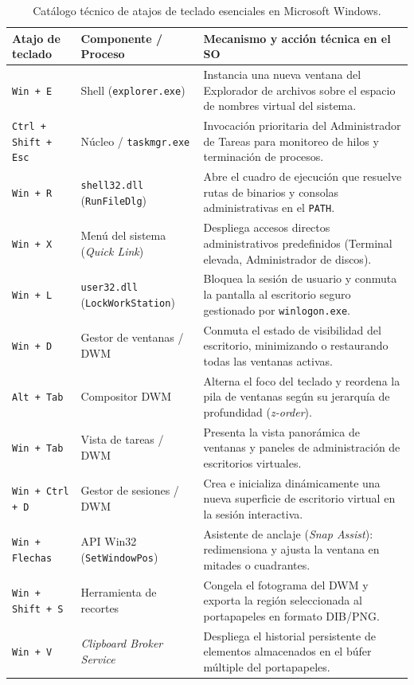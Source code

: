 \documentclass[12pt]{article}
\begin{document}
\begin{table}[htbp]
\centering
\footnotesize
\renewcommand{\arraystretch}{1.08}
\renewcommand{\tabularxcolumn}[1]{m{#1}}
\setlength{\emergencystretch}{1.5em}
\caption{Catálogo técnico de atajos de teclado esenciales en Microsoft Windows.}
\label{tab:catalogoAtajosWindows}
\begin{tabularx}{\textwidth}{>{\centering\arraybackslash}m{2.8cm} X X}
\toprule
\textbf{Atajo de teclado} & \textbf{Componente / Proceso} & \textbf{Mecanismo y acción técnica en el SO} \\
\midrule
\texttt{Win + E} & Shell (\texttt{explorer.exe}) & Instancia una nueva ventana del Explorador de archivos sobre el espacio de nombres virtual del sistema. \\
\addlinespace
\texttt{Ctrl + Shift + Esc} & Núcleo / \texttt{taskmgr.exe} & Invocación prioritaria del Administrador de Tareas para monitoreo de hilos y terminación de procesos. \\
\addlinespace
\texttt{Win + R} & \texttt{shell32.dll} (\texttt{RunFileDlg}) & Abre el cuadro de ejecución que resuelve rutas de binarios y consolas administrativas en el \texttt{PATH}. \\
\addlinespace
\texttt{Win + X} & Menú del sistema (\textit{Quick Link}) & Despliega accesos directos administrativos predefinidos (Terminal elevada, Administrador de discos). \\
\addlinespace
\texttt{Win + L} & \texttt{user32.dll} (\texttt{LockWorkStation}) & Bloquea la sesión de usuario y conmuta la pantalla al escritorio seguro gestionado por \texttt{winlogon.exe}. \\
\addlinespace
\texttt{Win + D} & Gestor de ventanas / DWM & Conmuta el estado de visibilidad del escritorio, minimizando o restaurando todas las ventanas activas. \\
\addlinespace
\texttt{Alt + Tab} & Compositor DWM & Alterna el foco del teclado y reordena la pila de ventanas según su jerarquía de profundidad (\textit{z-order}). \\
\addlinespace
\texttt{Win + Tab} & Vista de tareas / DWM & Presenta la vista panorámica de ventanas y paneles de administración de escritorios virtuales. \\
\addlinespace
\texttt{Win + Ctrl + D} & Gestor de sesiones / DWM & Crea e inicializa dinámicamente una nueva superficie de escritorio virtual en la sesión interactiva. \\
\addlinespace
\texttt{Win + Flechas} & API Win32 (\texttt{SetWindowPos}) & Asistente de anclaje (\textit{Snap Assist}): redimensiona y ajusta la ventana en mitades o cuadrantes. \\
\addlinespace
\texttt{Win + Shift + S} & Herramienta de recortes & Congela el fotograma del DWM y exporta la región seleccionada al portapapeles en formato DIB/PNG. \\
\addlinespace
\texttt{Win + V} & \textit{Clipboard Broker Service} & Despliega el historial persistente de elementos almacenados en el búfer múltiple del portapapeles. \\
\bottomrule
\end{tabularx}
\end{table}
\end{document}
